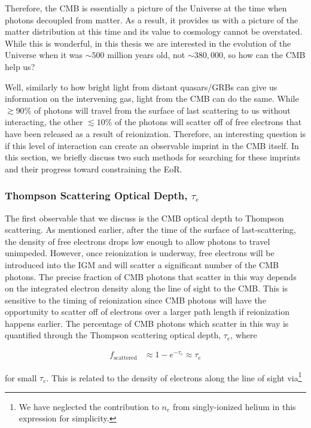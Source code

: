 Therefore, the CMB is essentially a picture of the Universe at the time when photons decoupled from matter. As a result, it provides us with a picture of the matter distribution at this time and its value to cosmology cannot be overstated. While this is wonderful, in this thesis we are interested in the evolution of the Universe when it was $\sim500$ million years old, not $\sim380,000$, so how can the CMB help us? 


Well, similarly to how bright light from distant quasars/GRBs can give us information on the intervening gas, light from the CMB can do the same. While $\gtrsim90\%$ of photons will travel from the surface of last scattering to us without interacting, the other $\lesssim10\%$ of the photons will scatter off of free electrons that have been released as a result of reionization. Therefore, an interesting question is if this level of interaction can create an observable imprint in the CMB itself. In this section, we briefly discuss two such methods for searching for these imprints and their progress toward constraining the EoR.


\subsubsection{Thompson Scattering Optical Depth, $\tau_{e}$}


The first observable that we discuss is the CMB optical depth to Thompson scattering. As mentioned earlier, after the time of the surface of last-scattering, the density of free electrons drops low enough to allow photons to travel unimpeded. However, once reionization is underway, free electrons will be introduced into the IGM and will scatter a significant number of the CMB photons. The precise fraction of CMB photons that scatter in this way depends on the integrated electron density along the line of sight to the CMB. This is sensitive to the timing of reionization since CMB photons will have the opportunity to scatter off of electrons over a larger path length if reionization happens earlier. The percentage of CMB photons which scatter in this way is quantified through the Thompson scattering optical depth, $\tau_{e}$, where

\begin{align}
f_{\text{scattered}} &\approx 1-e^{-\tau_{e}} \approx \tau_{e}
\end{align}

for small $\tau_{e}$. This is related to the density of electrons along the line of sight via\footnote{We have neglected the contribution to $n_e$ from singly-ionized helium in this expression for simplicity.}

